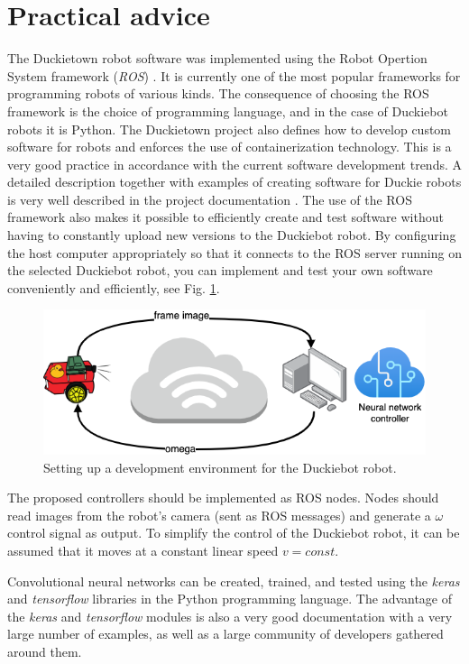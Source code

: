 \documentclass[conference]{IEEEtran}
\begin{document}
\section{Practical advice}\label{sec:practical-info}
The Duckietown robot software was implemented using the Robot Opertion System framework (\emph{ROS}) \cite{quigley2015programming}. It is currently one of the most popular frameworks for programming robots of various kinds. The consequence of choosing the ROS framework is the choice of programming language, and in the case of Duckiebot robots it is Python. The Duckietown project also defines how to develop custom software for robots and enforces the use of containerization technology. This is a very good practice in accordance with the current software development trends. A detailed description together with examples of creating software for Duckie robots is very well described in the project documentation \cite{Daniele:ff}. 
The use of the ROS framework also makes it possible to efficiently create and test software without having to constantly upload new versions to the Duckiebot robot. By configuring the host computer appropriately so that it connects to the ROS server running on the selected Duckiebot robot, you can implement and test your own software conveniently and efficiently, see Fig. \ref{fig:env-develop}.

\begin{figure}[h]
    \centering
    \includegraphics[width=.8\columnwidth]{controll_schema2}
    \caption{Setting up a development environment for the Duckiebot robot.}
    \label{fig:env-develop}
\end{figure}

The proposed controllers should be implemented as ROS nodes. Nodes should read images from the robot's camera (sent as ROS messages) and generate a $\omega$ control signal as output. To simplify the control of the Duckiebot robot, it can be assumed that it moves at a constant linear speed $v=const$.

Convolutional neural networks can be created, trained, and tested using the \emph{keras} and \emph{tensorflow} libraries in the Python programming language. The advantage of the \emph{keras} and \emph{tensorflow} modules is also a very good documentation with a very large number of examples, as well as a large community of developers gathered around them.
\end{document}
